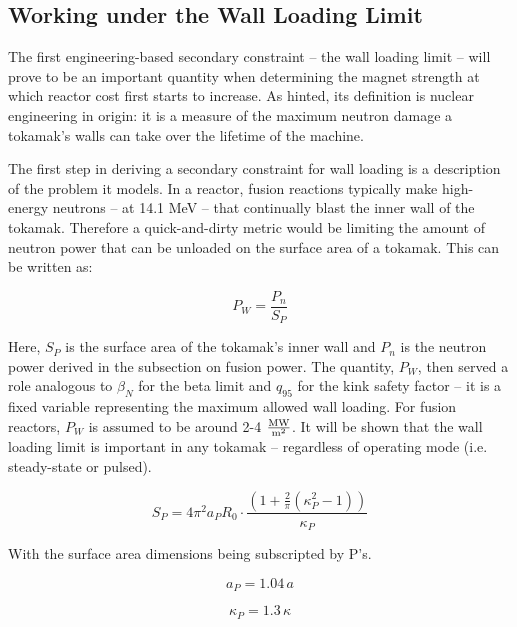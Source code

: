 \subsection{Working under the Wall Loading Limit}

The first engineering-based secondary constraint -- the wall loading limit -- will prove to be an important quantity when determining the magnet strength at which reactor cost first starts to increase. As hinted, its definition is nuclear engineering in origin: it is a measure of the maximum neutron damage a tokamak's walls can take over the lifetime of the machine.

The first step in deriving a secondary constraint for wall loading is a description of the problem it models. In a reactor, fusion reactions typically make high-energy neutrons -- at 14.1 MeV -- that continually blast the inner wall of the tokamak. Therefore a quick-and-dirty metric would be limiting the amount of neutron power that can be unloaded on the surface area of a tokamak. This can be written as:

\begin{equation}
	P_W = \frac{ P_n }{ S_P }
\end{equation}

Here, $S_P$ is the surface area of the tokamak's inner wall and $P_n$ is the neutron power derived in the subsection on fusion power. The quantity, $P_W$, then served a role analogous to $\beta_N$ for the beta limit and $q_{95}$ for the kink safety factor -- it is a fixed variable representing the maximum allowed wall loading. For fusion reactors, $P_W$ is assumed to be around 2-4 $\frac{\textnormal{MW}}{\textnormal{m}^2}$. It will be shown that the wall loading limit is important in any tokamak -- regardless of operating mode (i.e. steady-state or pulsed).

\begin{equation}
	S_P = 4 \pi^2 a_P R_0 \cdot \frac{ \left( 1 + \frac{2}{\pi} \left( \kappa_P^2 -1 \right) \right) }{ \kappa_P }
\end{equation}

With the surface area dimensions being subscripted by P's.

\begin{equation}
	a_P = 1.04 \, a
\end{equation}

\begin{equation}
	\kappa_P = 1.3 \, \kappa
\end{equation}

